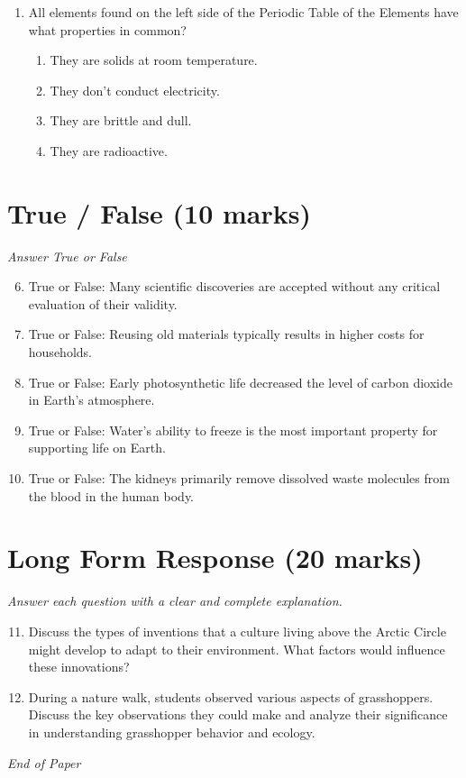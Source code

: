 \documentclass[12pt]{article}
\begin{document}
\begin{enumerate}[label=\arabic*.]
\begin{enumerate}[label=(\alph*)]
    \item observation
    \item measurement
\end{enumerate}
\item All elements found on the left side of the Periodic Table of the Elements have what properties in common?
\begin{enumerate}[label=(\alph*)]
    \item They are solids at room temperature.
    \item They don't conduct electricity.
    \item They are brittle and dull.
    \item They are radioactive.
\end{enumerate}
\end{enumerate}

\section*{True / False (10 marks)}
\textit{Answer True or False}
\begin{enumerate}[label=\arabic*.]
\setcounter{enumi}{5}
\item True or False: Many scientific discoveries are accepted without any critical evaluation of their validity.
\item True or False: Reusing old materials typically results in higher costs for households.
\item True or False: Early photosynthetic life decreased the level of carbon dioxide in Earth's atmosphere.
\item True or False: Water's ability to freeze is the most important property for supporting life on Earth.
\item True or False: The kidneys primarily remove dissolved waste molecules from the blood in the human body.
\end{enumerate}

\section*{Long Form Response (20 marks)}
\textit{Answer each question with a clear and complete explanation.}
\begin{enumerate}[label=\arabic*.]
\setcounter{enumi}{10}
\item Discuss the types of inventions that a culture living above the Arctic Circle might develop to adapt to their environment. What factors would influence these innovations?
\item During a nature walk, students observed various aspects of grasshoppers. Discuss the key observations they could make and analyze their significance in understanding grasshopper behavior and ecology.
\end{enumerate}

\vfill
\noindent\textit{End of Paper}
\end{document}
